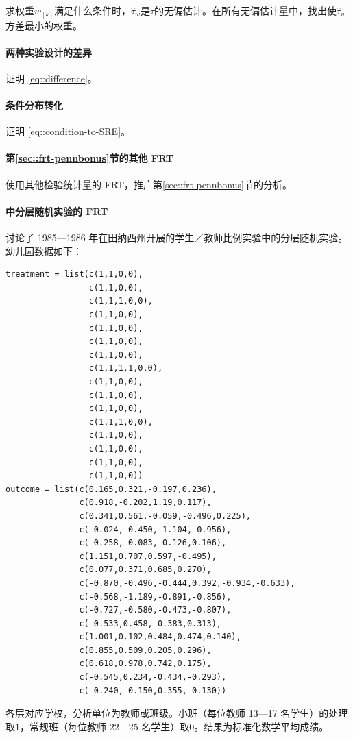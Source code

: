 求权重$w_{[k]}$满足什么条件时，$\hat{\tau}_w $是$\tau$的无偏估计。在所有无偏估计量中，找出使$\hat{\tau}_w$方差最小的权重。 


\paragraph{两种实验设计的差异}\label{hw::compare-CRE-SRE}

证明 \eqref{eq::difference}。



\paragraph{条件分布转化}\label{hw::CRE-SRE}


证明 \eqref{eq::condition-to-SRE}。


 
 \paragraph{第\ref{sec::frt-pennbonus}节的其他 FRT}\label{hw::FRT-SRE-more}
 
 使用其他检验统计量的 FRT，推广第\ref{sec::frt-pennbonus}节的分析。


 
 \paragraph{\citet{imbens2015causal}中分层随机实验的 FRT}


\citet{imbens2015causal}讨论了 1985—1986 年在田纳西州开展的学生／教师比例实验中的分层随机实验。幼儿园数据如下：
 \begin{lstlisting}
treatment = list(c(1,1,0,0), 
                 c(1,1,0,0), 
                 c(1,1,1,0,0), 
                 c(1,1,0,0),
                 c(1,1,0,0),
                 c(1,1,0,0),
                 c(1,1,0,0), 
                 c(1,1,1,1,0,0),
                 c(1,1,0,0),
                 c(1,1,0,0),
                 c(1,1,0,0),
                 c(1,1,1,0,0),
                 c(1,1,0,0),
                 c(1,1,0,0),
                 c(1,1,0,0),
                 c(1,1,0,0))
outcome = list(c(0.165,0.321,-0.197,0.236), 
               c(0.918,-0.202,1.19,0.117),
               c(0.341,0.561,-0.059,-0.496,0.225),
               c(-0.024,-0.450,-1.104,-0.956), 
               c(-0.258,-0.083,-0.126,0.106),
               c(1.151,0.707,0.597,-0.495), 
               c(0.077,0.371,0.685,0.270), 
               c(-0.870,-0.496,-0.444,0.392,-0.934,-0.633), 
               c(-0.568,-1.189,-0.891,-0.856), 
               c(-0.727,-0.580,-0.473,-0.807), 
               c(-0.533,0.458,-0.383,0.313), 
               c(1.001,0.102,0.484,0.474,0.140), 
               c(0.855,0.509,0.205,0.296), 
               c(0.618,0.978,0.742,0.175), 
               c(-0.545,0.234,-0.434,-0.293), 
               c(-0.240,-0.150,0.355,-0.130))
\end{lstlisting}
各层对应学校，分析单位为教师或班级。小班（每位教师 13—17 名学生）的处理取$1$，常规班（每位教师 22—25 名学生）取$0$。结果为标准化数学平均成绩。


